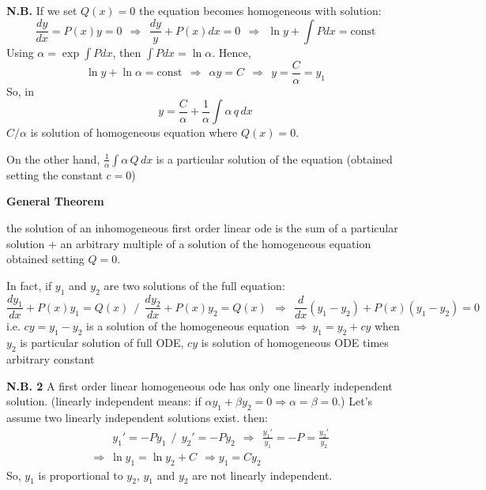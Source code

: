 \documentclass{article}
\begin{document}
\newpage

\noindent
\textbf{N.B.} If we set $Q(x)=0$ the equation becomes homogeneous with solution:
\begin{equation}
    \frac{dy}{dx} = P(x) y = 0 \ \ \Rightarrow \ \ \frac{dy}{y} + P(x)dx = 0 \ \ \Rightarrow \ \ \ln{y} + \int Pdx = \text{const}
\end{equation}
Using $\alpha = \exp \int Pdx$, then $\int Pdx = \ln \alpha$. Hence,
\begin{equation}
    \ln y + \ln \alpha = \text{const} \ \ \Rightarrow \ \ \alpha y = C \ \ \Rightarrow \ \ y = \frac{C}{\alpha} = y_1
\end{equation}
So, in
\begin{equation}
    y = \frac{C}{\alpha} + \frac{1}{\alpha} \int \alpha\, q\, dx
\end{equation}
$C/\alpha$ is solution of homogeneous equation where $Q(x) = 0$.

\noindent
On the other hand, $\frac{1}{\alpha} \int \alpha\, Q\, dx
$ is a particular solution of the equation (obtained setting the constant $c=0$)

\vspace{2mm}\noindent
\textbf{General Theorem}

\noindent
the solution of an inhomogeneous first order linear ode is the sum of a particular solution + an arbitrary multiple of a solution of the homogeneous equation obtained setting $Q=0$.

\noindent
In fact, if $y_1$ and $y_2$ are two solutions of the full equation:
\begin{equation}
    \frac{dy_1}{dx} + P(x)y_1 = Q(x) \ \ / \ \ \frac{dy_2}{dx} + P(x)y_2 = Q(x) \ \ \Rightarrow \ \ \frac{d}{dx}(y_1 - y_2) + P(x)(y_1 - y_2) = 0
\end{equation}
i.e. $cy = y_1 - y_2$ is a solution of the homogeneous equation $\Rightarrow \  y_1 = y_2 + cy$ when $y_2$ is particular solution of full ODE, $cy$ is solution of homogeneous ODE times arbitrary constant

\vspace{2mm}\noindent
\textbf{N.B. 2} A first order linear homogeneous ode has only one linearly independent solution. (linearly independent means: if $\alpha y_1 + \beta y_2 = 0 \Rightarrow \alpha = \beta = 0$.) Let’s assume two linearly independent solutions exist. then:
\begin{align*}
    &\quad \quad y_1' = -P y_1 \ \ / \ \ y_2' = -P y_2 \ \ \Rightarrow \ \  \frac{y_1'}{y_1} = -P = \frac{y_2'}{y_2} \\
    &\Rightarrow \ \ln y_1 = \ln y_2 + C  \ \ \Rightarrow y_1 = C y_2
\end{align*}
So, $y_1$ is proportional to $y_2$, $y_1$ and $y_2$ are not linearly independent.
\end{document}
